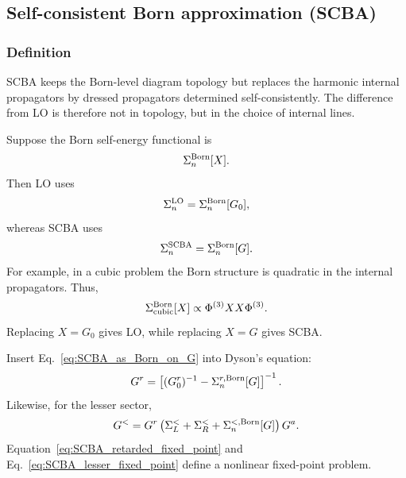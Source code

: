 \subsection{Self-consistent Born approximation (SCBA)}
\subsubsection{Definition}
SCBA keeps the Born-level diagram topology but replaces the harmonic internal propagators by dressed propagators determined self-consistently. The difference from LO is therefore not in topology, but in the choice of internal lines.

Suppose the Born self-energy functional is
\begin{equation}
    \Sigma_n^{\rm Born}[X].
\end{equation}
Then LO uses
\begin{equation}
    \Sigma_n^{\rm LO} = \Sigma_n^{\rm Born}[G_0],
    \label{eq:LO_as_Born_on_G0}
\end{equation}
whereas SCBA uses
\begin{equation}
    \Sigma_n^{\rm SCBA} = \Sigma_n^{\rm Born}[G].
    \label{eq:SCBA_as_Born_on_G}
\end{equation}
For example, in a cubic problem the Born structure is quadratic in the internal propagators. Thus,
\begin{equation}
    \Sigma_{\rm cubic}^{\rm Born}[X] \propto \Phi^{(3)} X X \Phi^{(3)}.
\end{equation}
Replacing $X=G_0$ gives LO, while replacing $X=G$ gives SCBA.

Insert Eq.~\eqref{eq:SCBA_as_Born_on_G} into Dyson's equation:
\begin{equation}
    G^r = \left[ (G_0^r)^{-1} - \Sigma_n^{r,\rm Born}[G] \right]^{-1}.
    \label{eq:SCBA_retarded_fixed_point}
\end{equation}
Likewise, for the lesser sector,
\begin{equation}
    G^< = G^r\left( \Sigma_L^< + \Sigma_R^< + \Sigma_n^{<,\rm Born}[G] \right)G^a.
    \label{eq:SCBA_lesser_fixed_point}
\end{equation}
Equation~\eqref{eq:SCBA_retarded_fixed_point} and Eq.~\eqref{eq:SCBA_lesser_fixed_point} define a nonlinear fixed-point problem.

